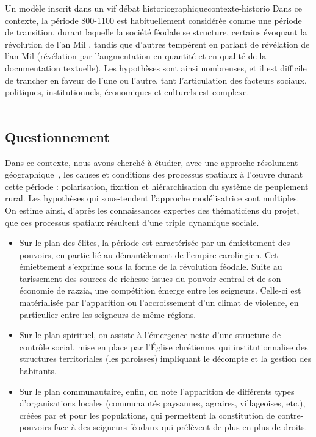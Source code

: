 \begin{encadre}{Un modèle inscrit dans un vif débat historiographique}{contexte-historio}
Dans ce contexte, la période 800-1100 est habituellement considérée comme une période de transition, durant laquelle la société féodale se structure, certains évoquant la \og révolution de l'an Mil\fg{} \autocite{fossier_enfance_1982}, tandis que d'autres tempèrent en parlant de \og révélation de l'an Mil\fg{} \autocite{barthelemy_societe_1993} (\og révélation\fg{} par l'augmentation en quantité et en qualité de la documentation textuelle).
Les hypothèses sont ainsi nombreuses, et il est difficile de trancher en faveur de l'une ou l'autre, tant l'articulation des facteurs sociaux, politiques, institutionnels, économiques et culturels est complexe.
\fg{}\\
\mbox{}~ \hfill \cite[301-302]{cura_transition_2017} 
\end{encadre}

\subsection{Questionnement \label{subsec:questionnement-modele}}
\citereset
Dans ce contexte, nous avons cherché à étudier, avec une approche \og résolument géographique\fg{}~\autocite[302]{cura_transition_2017}, les causes et conditions des processus spatiaux à l'œuvre durant cette période : polarisation, fixation et hiérarchisation du système de peuplement rural.
Les hypothèses qui sous-tendent l'approche modélisatrice sont multiples.
On estime ainsi, d'après les connaissances expertes des thématiciens du projet, que ces processus spatiaux résultent d'une triple dynamique sociale.

\begin{itemize}
	\item Sur le plan des élites, la période est caractérisée par un émiettement des pouvoirs, en partie lié au démantèlement de l'empire carolingien.
	Cet émiettement s'exprime sous la forme de la \og révolution féodale\fg{}.
	Suite au tarissement des sources de richesse issues du pouvoir central et de son économie de razzia, une compétition émerge entre les seigneurs.
	Celle-ci est matérialisée par l'apparition ou l'accroissement d'un climat de violence, en particulier entre les seigneurs de même régions.
	\item Sur le plan spirituel, on assiste à l'émergence nette d'une structure de contrôle social, mise en place par l'Église chrétienne, qui institutionnalise des structures territoriales (les paroisses) impliquant le décompte et la gestion des habitants.
	\item Sur le plan communautaire, enfin, on note l'apparition de différents types d'organisations locales (communautés paysannes, agraires, villageoises, etc.), créées par et pour les populations, qui permettent la constitution de contre-pouvoirs face à des seigneurs féodaux qui prélèvent de plus en plus de droits.
\end{itemize}

